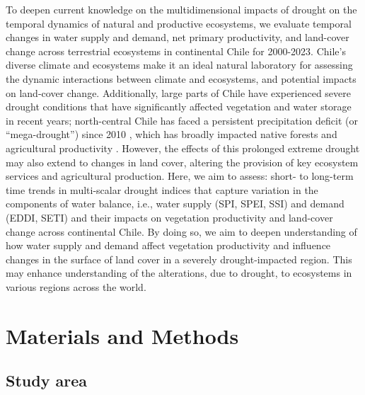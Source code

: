 \documentclass[
  sn-nature,
  numbered]{sn-jnl}
\begin{document}
To deepen current knowledge on the multidimensional impacts of drought
on the temporal dynamics of natural and productive ecosystems, we
evaluate temporal changes in water supply and demand, net primary
productivity, and land-cover change across terrestrial ecosystems in
continental Chile for 2000-2023. Chile's diverse climate and ecosystems
\citep{Beck2023, Luebert2022} make it an ideal natural laboratory for
assessing the dynamic interactions between climate and ecosystems, and
potential impacts on land-cover change. Additionally, large parts of
Chile have experienced severe drought conditions that have significantly
affected vegetation and water storage in recent years; north-central
Chile has faced a persistent precipitation deficit (or ``mega-drought'')
since 2010 \citep{Garreaud2017}, which has broadly impacted native
forests \citep[e.g.,][]{Miranda2020, UrrutiaJalabert2018, Venegas2018}
and agricultural productivity
\citep[e.g.,][]{Zambrano2016, Zambrano2018, Zambrano2023}. However, the
effects of this prolonged extreme drought may also extend to changes in
land cover, altering the provision of key ecosystem services and
agricultural production. Here, we aim to assess: short- to long-term
time trends in multi-scalar drought indices that capture variation in
the components of water balance, i.e., water supply (SPI, SPEI, SSI) and
demand (EDDI, SETI) and their impacts on vegetation productivity and
land-cover change across continental Chile. By doing so, we aim to
deepen understanding of how water supply and demand affect vegetation
productivity and influence changes in the surface of land cover in a
severely drought-impacted region. This may enhance understanding of the
alterations, due to drought, to ecosystems in various regions across the
world.

\section{Materials and Methods}\label{materials-and-methods}

\subsection{Study area}\label{study-area}
\end{document}
